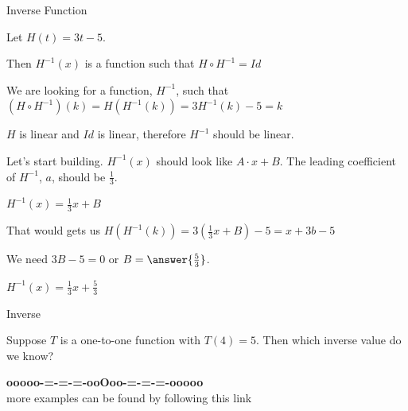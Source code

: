 \documentclass{ximera}
\begin{document}
\begin{example} Inverse Function


Let $H(t) = 3t - 5$. 

Then $H^{-1}(x)$ is a function such that $H \circ H^{-1} = Id$ 


We are looking for a function, $H^{-1}$, such that $(H \circ H^{-1})(k) = H(H^{-1}(k)) = 3 H^{-1}(k) - 5 = k$ 



$H$ is linear and $Id$ is linear, therefore $H^{-1}$ should be linear.

Let's start building.  $H^{-1}(x)$ should look like $A \cdot x + B$.  The leading coefficient of $H^{-1}$, $a$, should be $\frac{1}{3}$.


$H^{-1}(x) =\frac{1}{3} x + B$


That would gets us $H(H^{-1}(k)) = 3 (\frac{1}{3}x + B) - 5 = x + 3b - 5 $


We need $3B - 5 = 0$ or $B = \answer{\frac{5}{3}}$.


$H^{-1}(x) =\frac{1}{3} x + \frac{5}{3}$



\end{example}




\begin{question} Inverse


Suppose $T$ is a one-to-one function with $T(4) = 5$. Then which inverse value do we know?


\begin{multipleChoice}
\end{multipleChoice}

\end{question}





















\begin{center}
\textbf{\textcolor{green!50!black}{ooooo-=-=-=-ooOoo-=-=-=-ooooo}} \\

more examples can be found by following this link\\ 

\end{center}
\end{document}
